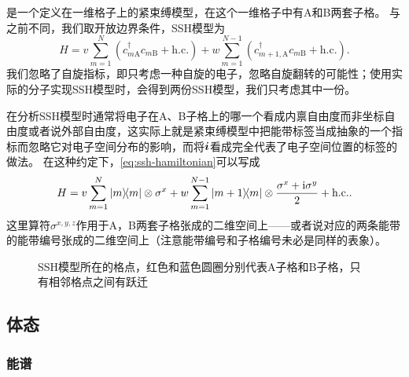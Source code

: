 是一个定义在一维格子上的紧束缚模型，在这个一维格子中有A和B两套子格\cite{Asb_th_2016}。
与之前不同，我们取开放边界条件，SSH模型为
\begin{equation}
    H = v \sum_{m=1}^N (c^\dagger_{m \text{A}} c_{m \text{B}} + \text{h.c.}) + w \sum_{m=1}^{N-1} (c^\dagger_{m+1, \text{A}} c_{m \text{B}} +  \text{h.c.}).
    \label{eq:ssh-hamiltonian}
\end{equation}
我们忽略了自旋指标，即只考虑一种自旋的电子，忽略自旋翻转的可能性；使用实际的分子实现SSH模型时，会得到两份SSH模型，我们只考虑其中一份。

在分析SSH模型时通常将电子在A、B子格上的哪一个看成内禀自由度而非坐标自由度或者说外部自由度，这实际上就是紧束缚模型中把能带标签当成抽象的一个指标而忽略它对电子空间分布的影响，而将$\vb*{i}$看成完全代表了电子空间位置的标签的做法。
在这种约定下，\eqref{eq:ssh-hamiltonian}可以写成
\begin{equation}
    H = v \sum_{m=1}^N \dyad{m} \otimes \sigma^x + w \sum_{m=1}^{N-1} \dyad{m+1}{m} \otimes \frac{\sigma^x + \ii \sigma^y}{2} + \text{h.c.}. 
    \label{eq:ssh-pseudospin-hamiltonian}
\end{equation}
这里算符$\sigma^{x, y, z}$作用于A，B两套子格张成的二维空间上——或者说对应的两条能带的能带编号张成的二维空间上（注意能带编号和子格编号未必是同样的表象）。

\begin{figure}
    \centering
    
    \caption{SSH模型所在的格点，红色和蓝色圆圈分别代表A子格和B子格，只有相邻格点之间有跃迁}
\end{figure}

\subsection{体态}

\subsubsection{能谱}

